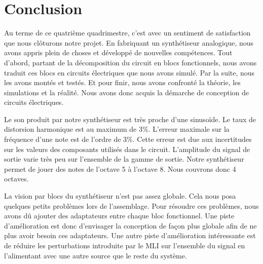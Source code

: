 \chapter{Conclusion}

Au terme de ce quatrième quadrimestre, c'est avec un sentiment de satisfaction que nous clôturons notre projet. En fabriquant un synthétiseur analogique, nous avons appris plein de choses et développé de nouvelles compétences. Tout d'abord, partant de la décomposition du circuit en blocs fonctionnels, nous avons traduit ces blocs en circuits électriques que nous avons simulé. Par la suite, nous les avons montés et testés. Et pour finir, nous avons confronté la théorie, les simulations et la réalité. Nous avons donc acquis la démarche de conception de circuits électriques.

Le son produit par notre synthétiseur est très proche d'une sinusoïde. Le taux de distorsion harmonique est au maximum de 3\%. L'erreur maximale sur la fréquence d'une note est de l'ordre de 3\%. Cette erreur est due aux incertitudes sur les valeurs des composants utilisés dans le circuit.
L'amplitude du signal de sortie varie très peu sur l'ensemble de la gamme de sortie. Notre synthétiseur permet de jouer des notes de l'octave 5 à l'octave 8. Nous couvrons donc 4 octaves.

La vision par blocs du synthétiseur n'est pas assez globale. Cela nous posa  quelques petits problèmes lors de l'assemblage. Pour résoudre ces problèmes, nous avons dû ajouter des adaptateurs entre chaque bloc fonctionnel. Une piste d'amélioration est donc d'envisager la conception de façon plus globale  afin de ne plus avoir besoin ces adaptateurs.
Une autre piste d'amélioration intéressante est de réduire les perturbations introduite par le MLI sur l'ensemble du signal en l'alimentant avec une autre source que le reste du système.